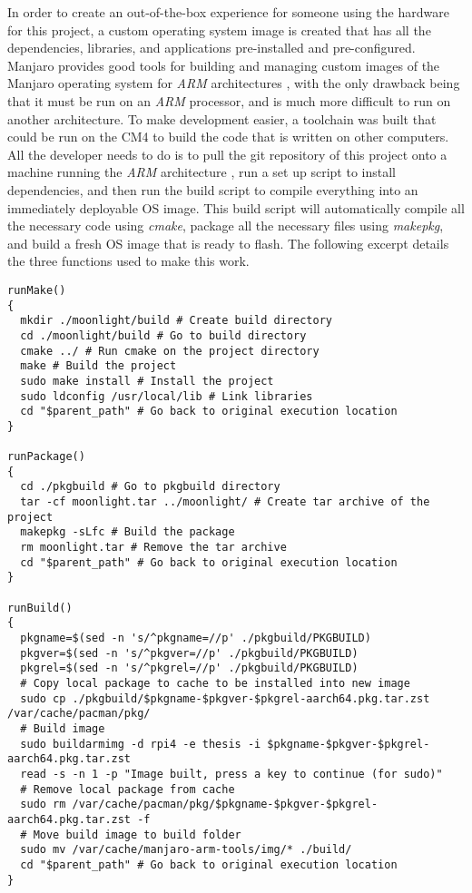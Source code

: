 In order to create an out-of-the-box experience for someone using the hardware for this project, a custom operating system image is created that has all the dependencies, libraries, and applications pre-installed and pre-configured.
Manjaro provides good tools for building and managing custom images of the Manjaro operating system for \emph{ARM} architectures \cite{manjaro_arm_tools}, with the only drawback being that it must be run on an \emph{ARM} processor, and is much more difficult to run on another architecture.
To make development easier, a toolchain was built that could be run on the CM4 to build the code that is written on other computers.
All the developer needs to do is to pull the git repository of this project onto a machine running the \emph{ARM} architecture \cite{ProjectGitHub}, run a set up script to install dependencies, and then run the build script to compile everything into an immediately deployable OS image.
This build script will automatically compile all the necessary code using \emph{cmake}, package all the necessary files using \emph{makepkg}, and build a fresh OS image that is ready to flash.
The following excerpt details the three functions used to make this work.

\begin{lstlisting}[style=custombash,firstnumber=50,title=Excerpt from \emph{/scripts/build.sh}]
runMake()
{
  mkdir ./moonlight/build # Create build directory
  cd ./moonlight/build # Go to build directory
  cmake ../ # Run cmake on the project directory
  make # Build the project
  sudo make install # Install the project
  sudo ldconfig /usr/local/lib # Link libraries
  cd "$parent_path" # Go back to original execution location
}

runPackage()
{
  cd ./pkgbuild # Go to pkgbuild directory
  tar -cf moonlight.tar ../moonlight/ # Create tar archive of the project
  makepkg -sLfc # Build the package
  rm moonlight.tar # Remove the tar archive
  cd "$parent_path" # Go back to original execution location
}

runBuild()
{
  pkgname=$(sed -n 's/^pkgname=//p' ./pkgbuild/PKGBUILD)
  pkgver=$(sed -n 's/^pkgver=//p' ./pkgbuild/PKGBUILD)
  pkgrel=$(sed -n 's/^pkgrel=//p' ./pkgbuild/PKGBUILD)
  # Copy local package to cache to be installed into new image
  sudo cp ./pkgbuild/$pkgname-$pkgver-$pkgrel-aarch64.pkg.tar.zst /var/cache/pacman/pkg/
  # Build image
  sudo buildarmimg -d rpi4 -e thesis -i $pkgname-$pkgver-$pkgrel-aarch64.pkg.tar.zst
  read -s -n 1 -p "Image built, press a key to continue (for sudo)"
  # Remove local package from cache
  sudo rm /var/cache/pacman/pkg/$pkgname-$pkgver-$pkgrel-aarch64.pkg.tar.zst -f
  # Move build image to build folder
  sudo mv /var/cache/manjaro-arm-tools/img/* ./build/
  cd "$parent_path" # Go back to original execution location
}
\end{lstlisting}

